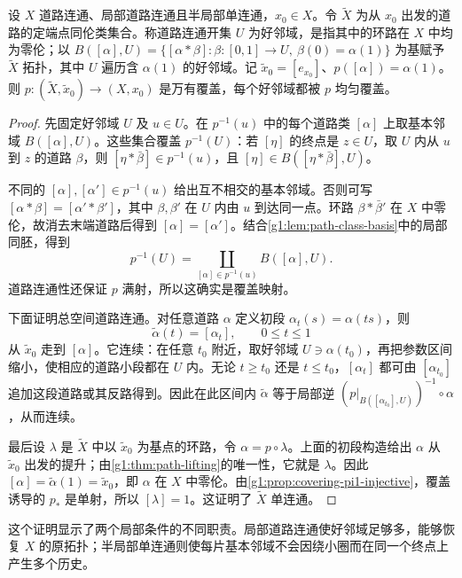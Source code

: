 \begin{theorem}\label{g1:thm:path-class-universal-cover}
	设 \(X\) 道路连通、局部道路连通且半局部单连通，\(x_0\in X\)。令 \(\widetilde X\) 为从 \(x_0\) 出发的道路的定端点同伦类集合。称道路连通开集 \(U\) 为好邻域，是指其中的环路在 \(X\) 中均为零伦；以 \(B([\alpha],U)=\{[\alpha*\beta]:\beta:[0,1]\to U,\ \beta(0)=\alpha(1)\}\) 为基赋予 \(\widetilde X\) 拓扑，其中 \(U\) 遍历含 \(\alpha(1)\) 的好邻域。记 \(\widetilde x_0=[e_{x_0}]\)、\(p([\alpha])=\alpha(1)\)。则 \(p:(\widetilde X,\widetilde x_0)\to(X,x_0)\) 是万有覆盖，每个好邻域都被 \(p\) 均匀覆盖。
\end{theorem}
\begin{proof}
	先固定好邻域 \(U\) 及 \(u\in U\)。在 \(p^{-1}(u)\) 中的每个道路类 \([\alpha]\) 上取基本邻域 \(B([\alpha],U)\)。这些集合覆盖 \(p^{-1}(U)\)：若 \([\eta]\) 的终点是 \(z\in U\)，取 \(U\) 内从 \(u\) 到 \(z\) 的道路 \(\beta\)，则 \([\eta*\bar\beta]\in p^{-1}(u)\)，且 \([\eta]\in B([\eta*\bar\beta],U)\)。

	不同的 \([\alpha],[\alpha']\in p^{-1}(u)\) 给出互不相交的基本邻域。否则可写 \([\alpha*\beta]=[\alpha'*\beta']\)，其中 \(\beta,\beta'\) 在 \(U\) 内由 \(u\) 到达同一点。环路 \(\beta*\bar\beta'\) 在 \(X\) 中零伦，故消去末端道路后得到 \([\alpha]=[\alpha']\)。结合\cref{g1:lem:path-class-basis}中的局部同胚，得到
	\[
		p^{-1}(U)=\coprod_{[\alpha]\in p^{-1}(u)}B([\alpha],U).
	\]
	道路连通性还保证 \(p\) 满射，所以这确实是覆盖映射。

	下面证明总空间道路连通。对任意道路 \(\alpha\) 定义初段 \(\alpha_t(s)=\alpha(ts)\)，则
	\[
		\widetilde\alpha(t)=[\alpha_t],\qquad 0\le t\le1
	\]
	从 \(\widetilde x_0\) 走到 \([\alpha]\)。它连续：在任意 \(t_0\) 附近，取好邻域 \(U\ni\alpha(t_0)\)，再把参数区间缩小，使相应的道路小段都在 \(U\) 内。无论 \(t\ge t_0\) 还是 \(t\le t_0\)，\([\alpha_t]\) 都可由 \([\alpha_{t_0}]\) 追加这段道路或其反路得到。因此在此区间内 \(\widetilde\alpha\) 等于局部逆 \((p|_{B([\alpha_{t_0}],U)})^{-1}\circ\alpha\)，从而连续。

	最后设 \(\lambda\) 是 \(\widetilde X\) 中以 \(\widetilde x_0\) 为基点的环路，令 \(\alpha=p\circ\lambda\)。上面的初段构造给出 \(\alpha\) 从 \(\widetilde x_0\) 出发的提升；由\cref{g1:thm:path-lifting}的唯一性，它就是 \(\lambda\)。因此 \([\alpha]=\widetilde\alpha(1)=\widetilde x_0\)，即 \(\alpha\) 在 \(X\) 中零伦。由\cref{g1:prop:covering-pi1-injective}，覆盖诱导的 \(p_*\) 是单射，所以 \([\lambda]=1\)。这证明了 \(\widetilde X\) 单连通。
\end{proof}

这个证明显示了两个局部条件的不同职责。局部道路连通使好邻域足够多，能够恢复 \(X\) 的原拓扑；半局部单连通则使每片基本邻域不会因绕小圈而在同一个终点上产生多个历史。

